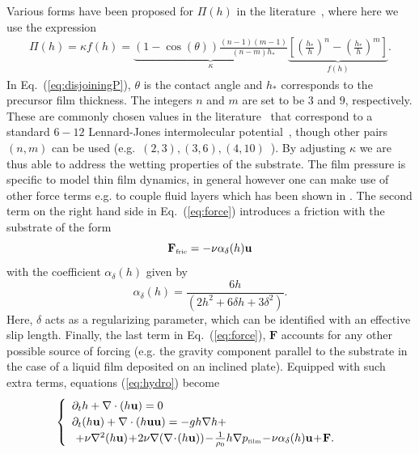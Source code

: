 Various forms have been proposed for $\Pi(h)$ in the
literature~\cite{oronLongscaleEvolutionThin1997,thielePatternedDepositionMoving2014}, where here we use the expression
\begin{eqnarray}\label{eq:disjoiningP}
\Pi(h) = \kappa f(h) = \underbrace{(1 - \cos(\theta))\frac{(n-1)(m-1)}{(n-m)h_*}}_{\kappa}\underbrace{\left[\left(\frac{h_*}{h}\right)^n -\left(\frac{h_*}{h}\right)^m\right]}_{f(h)}.
\end{eqnarray}
In Eq.~(\ref{eq:disjoiningP}), $\theta$ is the contact angle and $h_*$
corresponds to the precursor film
thickness. The integers $n$ and $m$ are set to be $3$ and $9$, respectively. These 
are commonly chosen values in the literature~\cite{moultonEffectDisjoiningPressure2013,oronLongscaleEvolutionThin1997}
that correspond to a standard $6-12$ Lennard-Jones
intermolecular potential~\cite{fischer2018existence}, though other pairs
$(n,m)$ can be used (e.g.~$(2,3), (3,6), (4,10)$~\cite{1742-6596-166-1-012009,
wilczekSlidingDropsEnsemble2017, wedershoven2014infrared}). 
By adjusting $\kappa$ we are thus able to address the wetting properties of the substrate. 
The film pressure is specific to model thin film dynamics, in general however one can make use of other force terms e.g. to couple fluid layers which has been shown in \cite{doi:10.1002/fld.2742}. The second term on the right hand side in Eq.~(\ref{eq:force}) introduces
a friction with the substrate of the form
\begin{equation}\label{eq:forcefric}
\mathbf{F}_{\mbox{\tiny{fric}}} = -\nu \alpha_{\delta}(h)\mathbf{u}
\end{equation}
with the coefficient $\alpha_{\delta}(h)$ given by
\begin{equation}\label{eq:alphafric}
\alpha_{\delta}(h) = \frac{6h}{(2 h^2 + 6 \delta h + 3 \delta^2)}.
\end{equation}
Here, $\delta$ acts as a regularizing parameter, which can 
be identified with an effective slip length. 
Finally, the last term in Eq.~(\ref{eq:force}), $\mathbf{F}$ accounts for any other possible source
of forcing (e.g. the gravity component parallel to the substrate in the case of a liquid film
deposited on an inclined plate).
Equipped with such extra terms, equations (\ref{eq:hydro}) become
\begin{equation}\label{eq:hydro2}
\begin{cases}
\begin{array}{ll}
\partial_t h + \nabla \cdot (h \mathbf{u})  = 0 & \\ 
\partial_t (h \mathbf{u}) + \nabla \cdot (h \mathbf{u}\mathbf{u}) = -gh \nabla h  +\\ 
\,\, +  \nu \nabla^2 (h\mathbf{u}) \!+\! 2\nu \nabla (\nabla\! \cdot\! (h\mathbf{u}))
\!-\!\frac{1}{\rho_0}h\nabla p_{\mbox{\tiny{film}}} \!-\! \nu \alpha_{\delta}(h) \mathbf{u}\!+\! \mathbf{F}. 
\end{array}
\end{cases}
\end{equation}
